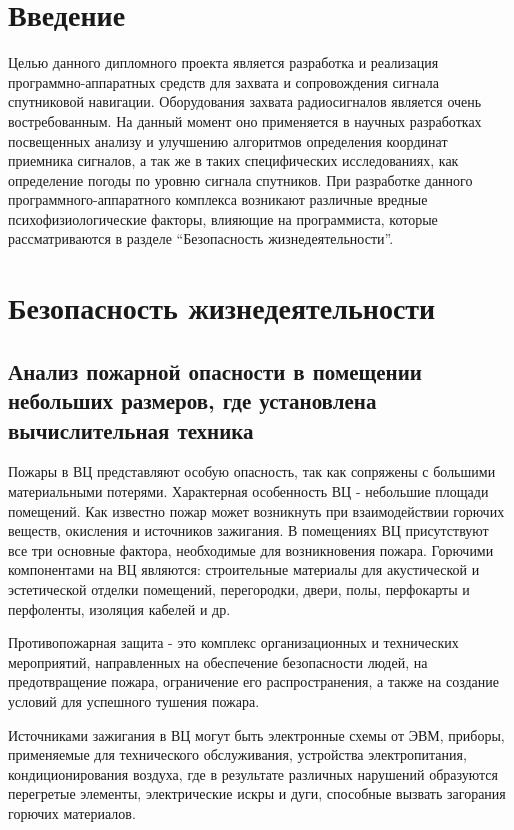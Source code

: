 \section*{Введение}
Целью данного дипломного проекта является разработка и реализация программно-аппаратных средств
для захвата и сопровождения сигнала спутниковой навигации. Оборудования захвата радиосигналов является очень востребованным.
На данный момент оно применяется в научных разработках посвещенных анализу и улучшению алгоритмов определения координат 
приемника сигналов, а так же в таких специфических исследованиях, как определение погоды по уровню сигнала спутников.
При разработке данного программного-аппаратного комплекса возникают различные вредные психофизиологические факторы, влияющие
на программиста, которые рассматриваются в разделе “Безопасность жизнедеятельности”.  

\newpage

\setcounter{section}{3}
\section{Безопасность жизнедеятельности}

\subsection{Анализ пожарной опасности в помещении небольших размеров, где установлена вычислительная техника}

Пожары в ВЦ представляют особую опасность, так как сопряжены с большими материальными потерями.
Характерная особенность ВЦ - небольшие площади помещений. Как известно пожар может возникнуть при взаимодействии
горючих веществ, окисления и источников зажигания. В помещениях ВЦ присутствуют все три основные фактора,
необходимые для возникновения пожара. Горючими компонентами на ВЦ являются: строительные материалы для
акустической и эстетической отделки помещений, перегородки, двери, полы, перфокарты и перфоленты, изоляция кабелей и др.

Противопожарная защита - это комплекс организационных и технических мероприятий, направленных на обеспечение безопасности людей,
на предотвращение пожара, ограничение его распространения, а также на создание условий для успешного тушения пожара.

Источниками зажигания в ВЦ могут быть электронные схемы от ЭВМ, приборы, применяемые для технического обслуживания,
устройства электропитания, кондиционирования воздуха, где в результате различных нарушений образуются перегретые элементы,
электрические искры и дуги, способные вызвать загорания горючих материалов.

